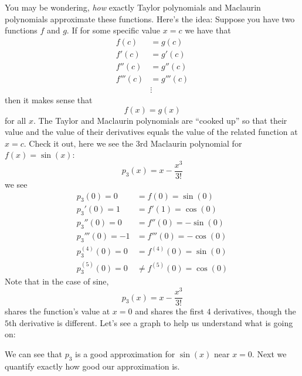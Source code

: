 \documentclass{ximera}
\begin{document}
You may be wondering, \textit{how} exactly Taylor polynomials and
Maclaurin polynomials approximate these functions. Here's the idea:
Suppose you have two functions $f$ and $g$. If for some specific value
$x=c$ we have that
\begin{align*}
  f(c) &= g(c)\\
  f'(c) &= g'(c)\\
  f''(c) &= g''(c)\\
  f'''(c) &= g'''(c)\\
          &\vdots
\end{align*}
then it makes sense that 
\[
f(x) = g(x)
\]
for all $x$. The Taylor and Maclaurin polynomials are ``cooked up'' so
that their value and the value of their derivatives equals the value
of the related function at $x=c$. Check it out, here we see the $3$rd
Maclaurin polynomial for $f(x) = \sin(x)$:
\[
p_3(x) = x - \frac{x^3}{3!} 
\]
we see
\begin{align*}
  p_3(0) = 0 &= f(0) = \sin(0)\\
  p_3'(0) = 1 &= f'(1) = \cos(0)\\
  p_3''(0) = 0 &= f''(0) = -\sin(0)\\
  p_3'''(0) = -1 &= f'''(0) = -\cos(0)\\
  p_3^{(4)}(0) = 0 &= f^{(4)}(0) = \sin(0)\\
  p_3^{(5)}(0) = 0 &\ne f^{(5)}(0) = \cos(0)
\end{align*}
Note that in the case of sine,
\[
p_3(x) = x - \frac{x^3}{3!} 
\]
shares the function's value at $x=0$ and shares the first $4$
derivatives, though the $5$th derivative is different. Let's see a
graph to help us understand what is going on:
      \begin{image}
      \end{image}
      We can see that $p_3$ is a good approximation for $\sin(x)$ near
      $x=0$. Next we quantify exactly how good our approximation is.
\end{document}
